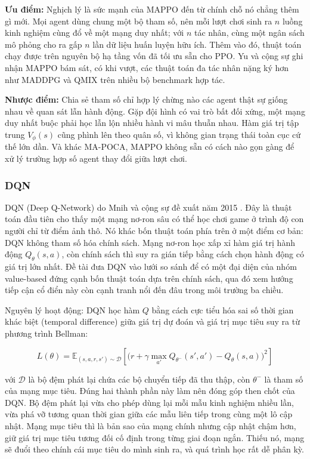 \indent \textbf{Ưu điểm:} Nghịch lý là sức mạnh của MAPPO đến từ chính chỗ nó chẳng thêm
gì mới. Mọi agent dùng chung một bộ tham số, nên mỗi lượt chơi sinh ra $n$ luồng kinh
nghiệm cùng đổ về một mạng duy nhất; với $n$ tác nhân, cùng một ngân sách mô phỏng cho ra
gấp $n$ lần dữ liệu huấn luyện hữu ích. Thêm vào đó, thuật toán chạy được trên nguyên bộ
hạ tầng vốn đã tối ưu sẵn cho PPO. Yu và cộng sự \cite{yu2022surprising} ghi nhận MAPPO
bám sát, có khi vượt, các thuật toán đa tác nhân nặng ký hơn như MADDPG và QMIX trên nhiều
bộ benchmark hợp tác.

\indent \textbf{Nhược điểm:} Chia sẻ tham số chỉ hợp lý chừng nào các agent thật sự giống
nhau về quan sát lẫn hành động. Gặp đội hình có vai trò bất đối xứng, một mạng duy nhất
buộc phải học lẫn lộn nhiều hành vi mâu thuẫn nhau. Hàm giá trị tập trung $V_\phi(s)$ cũng
phình lên theo quân số, vì không gian trạng thái toàn cục cứ thế lớn dần. Và khác MA-POCA,
MAPPO không sẵn có cách nào gọn gàng để xử lý trường hợp số agent thay đổi giữa lượt chơi.

\subsubsection{DQN}
\label{sub:dqn}
\indent DQN (Deep Q-Network) do Mnih và cộng sự đề xuất năm 2015 \cite{mnih2015humanlevel}.
Đây là thuật toán đầu tiên cho thấy một mạng nơ-ron sâu có thể học chơi game ở trình độ
con người chỉ từ điểm ảnh thô. Nó khác bốn thuật toán phía trên ở một điểm cơ bản: DQN
không tham số hóa chính sách. Mạng nơ-ron học xấp xỉ hàm giá trị hành động
$Q_\theta(s,a)$, còn chính sách thì suy ra gián tiếp bằng cách chọn hành động có giá trị
lớn nhất. Đề tài đưa DQN vào lưới so sánh để có một đại diện của nhóm value-based đứng
cạnh bốn thuật toán dựa trên chính sách, qua đó xem hướng tiếp cận cổ điển này còn cạnh
tranh nổi đến đâu trong môi trường ba chiều.

\indent Nguyên lý hoạt động: DQN học hàm $Q$ bằng cách cực tiểu hóa sai số thời
gian khác biệt (temporal difference) giữa giá trị dự đoán và giá trị mục tiêu suy ra từ
phương trình Bellman:

\begin{equation}
    L(\theta) = \mathbb{E}_{(s,a,r,s') \sim \mathcal{D}} \left[
        \Big( r + \gamma \max_{a'} Q_{\theta^-}(s', a') - Q_\theta(s, a) \Big)^2
    \right]
\end{equation}

\noindent với $\mathcal{D}$ là bộ đệm phát lại chứa các bộ chuyển tiếp đã thu thập, còn
$\theta^-$ là tham số của mạng mục tiêu. Đúng hai thành phần này làm nên đóng góp then
chốt của DQN. Bộ đệm phát lại vừa cho phép dùng lại mỗi mẫu kinh nghiệm nhiều lần, vừa phá
vỡ tương quan thời gian giữa các mẫu liên tiếp trong cùng một lô cập nhật. Mạng mục tiêu
thì là bản sao của mạng chính nhưng cập nhật chậm hơn, giữ giá trị mục tiêu tương đối cố
định trong từng giai đoạn ngắn. Thiếu nó, mạng sẽ đuổi theo chính cái mục tiêu do mình
sinh ra, và quá trình học rất dễ phân kỳ.

